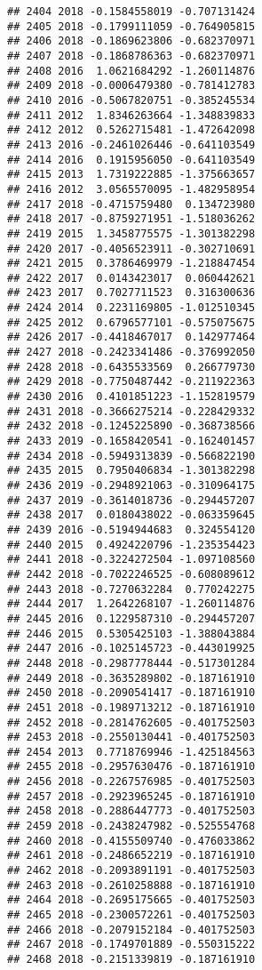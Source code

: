 \documentclass[
]{article}
\begin{document}
\begin{verbatim}
## 2404 2018 -0.1584558019 -0.707131424
## 2405 2018 -0.1799111059 -0.764905815
## 2406 2018 -0.1869623806 -0.682370971
## 2407 2018 -0.1868786363 -0.682370971
## 2408 2016  1.0621684292 -1.260114876
## 2409 2018 -0.0006479380 -0.781412783
## 2410 2016 -0.5067820751 -0.385245534
## 2411 2012  1.8346263664 -1.348839833
## 2412 2012  0.5262715481 -1.472642098
## 2413 2016 -0.2461026446 -0.641103549
## 2414 2016  0.1915956050 -0.641103549
## 2415 2013  1.7319222885 -1.375663657
## 2416 2012  3.0565570095 -1.482958954
## 2417 2018 -0.4715759480  0.134723980
## 2418 2017 -0.8759271951 -1.518036262
## 2419 2015  1.3458775575 -1.301382298
## 2420 2017 -0.4056523911 -0.302710691
## 2421 2015  0.3786469979 -1.218847454
## 2422 2017  0.0143423017  0.060442621
## 2423 2017  0.7027711523  0.316300636
## 2424 2014  0.2231169805 -1.012510345
## 2425 2012  0.6796577101 -0.575075675
## 2426 2017 -0.4418467017  0.142977464
## 2427 2018 -0.2423341486 -0.376992050
## 2428 2018 -0.6435533569  0.266779730
## 2429 2018 -0.7750487442 -0.211922363
## 2430 2016  0.4101851223 -1.152819579
## 2431 2018 -0.3666275214 -0.228429332
## 2432 2018 -0.1245225890 -0.368738566
## 2433 2019 -0.1658420541 -0.162401457
## 2434 2018 -0.5949313839 -0.566822190
## 2435 2015  0.7950406834 -1.301382298
## 2436 2019 -0.2948921063 -0.310964175
## 2437 2019 -0.3614018736 -0.294457207
## 2438 2017  0.0180438022 -0.063359645
## 2439 2016 -0.5194944683  0.324554120
## 2440 2015  0.4924220796 -1.235354423
## 2441 2018 -0.3224272504 -1.097108560
## 2442 2018 -0.7022246525 -0.608089612
## 2443 2018 -0.7270632284  0.770242275
## 2444 2017  1.2642268107 -1.260114876
## 2445 2016  0.1229587310 -0.294457207
## 2446 2015  0.5305425103 -1.388043884
## 2447 2016 -0.1025145723 -0.443019925
## 2448 2018 -0.2987778444 -0.517301284
## 2449 2018 -0.3635289802 -0.187161910
## 2450 2018 -0.2090541417 -0.187161910
## 2451 2018 -0.1989713212 -0.187161910
## 2452 2018 -0.2814762605 -0.401752503
## 2453 2018 -0.2550130441 -0.401752503
## 2454 2013  0.7718769946 -1.425184563
## 2455 2018 -0.2957630476 -0.187161910
## 2456 2018 -0.2267576985 -0.401752503
## 2457 2018 -0.2923965245 -0.187161910
## 2458 2018 -0.2886447773 -0.401752503
## 2459 2018 -0.2438247982 -0.525554768
## 2460 2018 -0.4155509740 -0.476033862
## 2461 2018 -0.2486652219 -0.187161910
## 2462 2018 -0.2093891191 -0.401752503
## 2463 2018 -0.2610258888 -0.187161910
## 2464 2018 -0.2695175665 -0.401752503
## 2465 2018 -0.2300572261 -0.401752503
## 2466 2018 -0.2079152184 -0.401752503
## 2467 2018 -0.1749701889 -0.550315222
## 2468 2018 -0.2151339819 -0.187161910

\end{verbatim}
\end{document}
